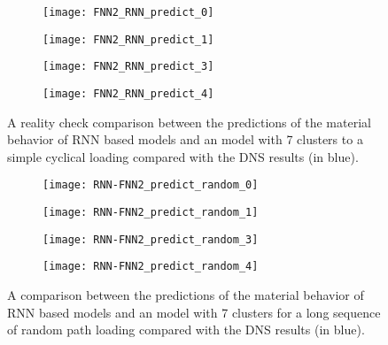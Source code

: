 \begin{figure}
	\centering
	\begin{subfigure}[t]{0.45\textwidth}
		\texttt{[image: FNN2\_RNN\_predict\_0]}
	\end{subfigure}
	\begin{subfigure}[t]{0.45\textwidth}
		\texttt{[image: FNN2\_RNN\_predict\_1]}
	\end{subfigure}
	\begin{subfigure}[t]{0.45\textwidth}
		\texttt{[image: FNN2\_RNN\_predict\_3]}
	\end{subfigure}
	\begin{subfigure}[t]{0.45\textwidth}
		\texttt{[image: FNN2\_RNN\_predict\_4]}
	\end{subfigure}
	\caption{A reality check comparison between the predictions of the material behavior of RNN based models and an \fnn model with 7 clusters to a simple cyclical loading compared with the DNS results (in blue).}\label{fig-nn-rnn5}
\end{figure}

\begin{figure}
	\centering
	\begin{subfigure}[t]{0.45\textwidth}
		\texttt{[image: RNN-FNN2\_predict\_random\_0]}
	\end{subfigure}
	\begin{subfigure}[t]{0.45\textwidth}
		\texttt{[image: RNN-FNN2\_predict\_random\_1]}
	\end{subfigure}
	\begin{subfigure}[t]{0.45\textwidth}
		\texttt{[image: RNN-FNN2\_predict\_random\_3]}
	\end{subfigure}
	\begin{subfigure}[t]{0.45\textwidth}
		\texttt{[image: RNN-FNN2\_predict\_random\_4]}
	\end{subfigure}
	\caption{A comparison between the predictions of the material behavior of RNN based models and an \fnn model with 7 clusters for a long sequence of random path loading compared with the DNS results (in blue).}\label{fig-nn-rnn6}
\end{figure}

